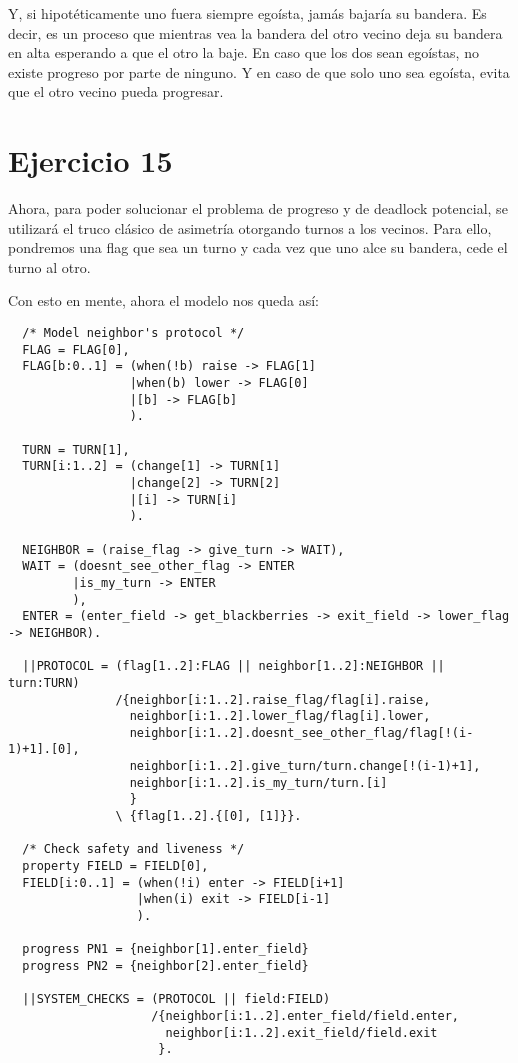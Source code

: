 \documentclass{article}
\begin{document}
Y, si hipotéticamente uno fuera siempre egoísta, jamás bajaría su bandera.
Es decir, es un proceso que mientras vea la bandera del otro vecino deja su bandera en alta esperando a que el otro la baje.
En caso que los dos sean egoístas, no existe progreso por parte de ninguno.
Y en caso de que solo uno sea egoísta, evita que el otro vecino pueda progresar.

\section*{Ejercicio 15}
Ahora, para poder solucionar el problema de progreso y de deadlock potencial, se utilizará el truco clásico de asimetría otorgando turnos a los vecinos.
Para ello, pondremos una flag que sea un turno y cada vez que uno alce su bandera, cede el turno al otro.

Con esto en mente, ahora el modelo nos queda así:
\begin{verbatim}
  /* Model neighbor's protocol */ 
  FLAG = FLAG[0],
  FLAG[b:0..1] = (when(!b) raise -> FLAG[1]
                 |when(b) lower -> FLAG[0]
                 |[b] -> FLAG[b]
                 ).
  
  TURN = TURN[1],
  TURN[i:1..2] = (change[1] -> TURN[1]
                 |change[2] -> TURN[2]
                 |[i] -> TURN[i]
                 ).

  NEIGHBOR = (raise_flag -> give_turn -> WAIT),
  WAIT = (doesnt_see_other_flag -> ENTER 
         |is_my_turn -> ENTER
         ),
  ENTER = (enter_field -> get_blackberries -> exit_field -> lower_flag -> NEIGHBOR).

  ||PROTOCOL = (flag[1..2]:FLAG || neighbor[1..2]:NEIGHBOR || turn:TURN)
               /{neighbor[i:1..2].raise_flag/flag[i].raise, 
                 neighbor[i:1..2].lower_flag/flag[i].lower,
                 neighbor[i:1..2].doesnt_see_other_flag/flag[!(i-1)+1].[0],
                 neighbor[i:1..2].give_turn/turn.change[!(i-1)+1],
                 neighbor[i:1..2].is_my_turn/turn.[i]
                 }
               \ {flag[1..2].{[0], [1]}}.

  /* Check safety and liveness */ 
  property FIELD = FIELD[0],
  FIELD[i:0..1] = (when(!i) enter -> FIELD[i+1]
                  |when(i) exit -> FIELD[i-1]
                  ).

  progress PN1 = {neighbor[1].enter_field}
  progress PN2 = {neighbor[2].enter_field}

  ||SYSTEM_CHECKS = (PROTOCOL || field:FIELD)
                    /{neighbor[i:1..2].enter_field/field.enter,
                      neighbor[i:1..2].exit_field/field.exit 
                     }. 
\end{verbatim}
\end{document}
